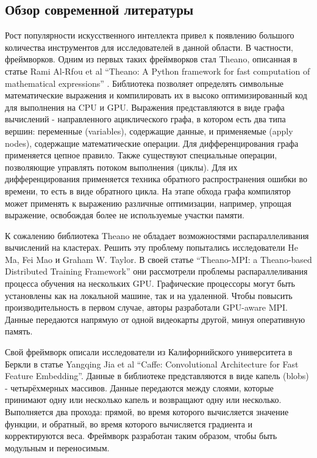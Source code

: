 \subsection{Обзор современной литературы}
Рост популярности искусственного интеллекта привел к появлению большого
количества инструментов для исследователей в данной области. В частности,
фреймворков. Одним из первых таких фреймворков стал Theano, описанная в статье
Rami Al-Rfou et al “Theano: A Python framework for fast computation of
mathematical expressions”\cite{theano} . Библиотека позволяет определять
символьные математические выражения и компилировать их в высоко оптимизированный
код для выполнения на CPU и GPU. Выражения представляются в виде графа
вычислений - направленного ациклического графа, в котором есть два типа вершин:
переменные (variables), содержащие данные, и применяемые (apply nodes),
содержащие математические операции. Для дифференцирования графа применяется
цепное правило. Также существуют специальные операции, позволяющие управлять
потоком выполнения (циклы). Для их дифференцирования применяется техника
обратного распространения ошибки во времени, то есть в виде обратного цикла.
На этапе обхода графа компилятор может применять к выражению различные
оптимизации, например, упрощая выражение, освобождая более не используемые
участки памяти.
\par
К сожалению библиотека Theano не обладает возможностями распараллеливания
вычислений на кластерах. Решить эту проблему попытались исследователи He Ma,
Fei Mao и Graham W. Taylor. В своей статье “Theano-MPI: a Theano-based
Distributed Training Framework”\cite{Ma2017} они рассмотрели проблемы
распараллеливания процесса обучения на нескольких GPU. Графические процессоры
могут быть установлены как на локальной машине, так и на удаленной. Чтобы
повысить производительность в первом случае, авторы разработали GPU-aware MPI.
Данные передаются напрямую от одной видеокарты другой, минуя оперативную память.
\par
Свой фреймворк описали исследователи из Калифорнийского университета в Беркли
в статье Yangqing Jia et al “Caffe: Convolutional Architecture for Fast Feature
Embedding”\cite{Jia2014}. Данные в библиотеке представляются в виде капель
(blobs) - четырёхмерных массивов. Данные передаются между слоями, которые
принимают одну или несколько капель и возвращают одну или несколько. Выполняется
два прохода: прямой, во время которого вычисляется значение функции, и обратный,
во время которого вычисляется градиента и корректируются веса. Фреймворк
разработан таким образом, чтобы быть модульным и переносимым.
